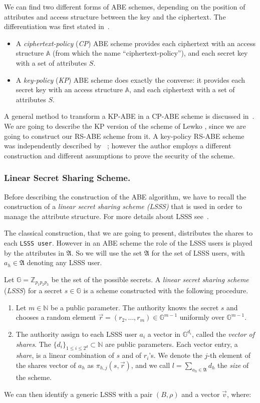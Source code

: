 \documentclass[a4paper,10pt]{article}
\newcommand{\G}{\mathbb{G}}
\newcommand{\Z}{\mathbb{Z}}
\newcommand{\ith}{\text{-th}}
\begin{document}
	We can find two different forms of ABE schemes, depending on the position of attributes and access structure between the key and the ciphertext. The differentiation was first stated in~\cite{goyal2006}.
	\begin{itemize}
		\item
		A \emph{ciphertext-policy} (\emph{CP}) ABE scheme provides  each ciphertext with an access structure $\mathbb{A}$ (from which the name ``ciphertext-policy''), and  each secret key with a set of attributes $S$.
		\item
		A \emph{key-policy} (\emph{KP}) ABE scheme does exactly the converse: it provides  each secret key with an access structure $\mathbb{A}$, and  each ciphertext with a set of attributes $S$.
	\end{itemize}
	A general method to transform a KP-ABE in a CP-ABE scheme is discussed in~\cite{goyal2008}.	
	We are going to describe the KP version of the scheme of Lewko \cite{lewko2010ABE}, since we are going to construct our RS-ABE scheme from it. A key-policy RS-ABE scheme was independently described by \citeauthor{lee2014}~\cite{lee2014}; however the author employs a different construction and different assumptions to prove the security of the scheme.
\subsubsection{Linear Secret Sharing Scheme.}	
Before describing the construction of the ABE algorithm, we have to recall the construction of a \emph{linear secret sharing scheme (LSSS)} that is used in order to manage the attribute structure. For more details about LSSS see~\cite{beimel1996SSS}.
\label{LSSS_def}

	The classical construction, that we are going to present, distributes the shares to each \texttt{LSSS user}. However in an ABE scheme the role of the LSSS users is played by the attributes in $\mathfrak{A}$. So we will use the set $\mathfrak{A}$ for the set of LSSS users, with $a_h\in\mathfrak{A}$ denoting any LSSS user.

		Let $\G=\Z_{p_1p_2p_3}$ be the set of the possible secrets. A \emph{linear secret sharing scheme}  (\emph{LSSS}) for a secret $s\in \G$ is a scheme constructed with the following procedure. 
		\begin{enumerate}
			\item
			Let $m\in\mathbb{N}$ be a public parameter. The authority knows the secret $s$ and chooses a random element $\vec{r}=\left(r_2,\ldots,r_{m}\right)\in \G^{m-1}$ uniformly over $\G^{m-1}$. 
			\item
			 The authority assign to each LSSS user $a_i$   a vector in $\G^{d_i}$, called the \emph{vector of shares}. The $\{d_i\}_{1\leq i \leq 2^d}\subset\mathbb{N}$ are  public parameters.  Each vector entry, a \emph{share}, is a linear combination of $s$ and of $r_i$'s.
\noindent We denote the $j\ith$ element of the shares vector of $a_h$ as $\pi_{h,j}(s,\vec{r})$, and we call $l=\sum_{a_h\in \mathfrak{A}}d_h$ the \emph{size} of the scheme.
		\end{enumerate}
	We can then identify a generic LSSS with a pair $(B,\rho)$ and a vector $\vec{v}$, where:
	
\end{document}
